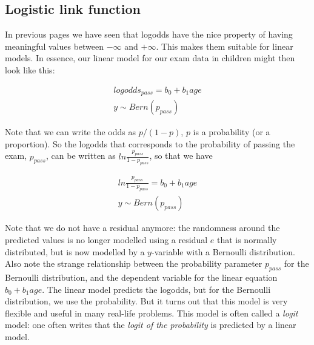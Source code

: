 \documentclass[]{book}\usepackage[]{graphicx}\usepackage[]{color}
\begin{document}
% 
% 
% 
% 
% 
% 
% 
% 
% 


\subsection{Logistic link function}

In previous pages we have seen that logodds have the nice property of having meaningful values between $-\infty$ and $+\infty$. This makes them suitable for linear models. In essence, our linear model for our exam data in children might then look like this:


\begin{eqnarray}
logodds_{pass}= b_0 + b_1 age\\
y \sim Bern(p_{pass})
\end{eqnarray}

Note that we can write the odds as $p/(1-p)$, $p$ is a probability (or a proportion). So the logodds that corresponds to the probability of passing the exam, $p_{pass}$, can be written as $ln\frac{p_{pass}}{1- p_{pass}}$, so that we have


\begin{eqnarray}
ln\frac{p_{pass}}{1- p_{pass}}= b_0 + b_1 age \\
y \sim Bern(p_{pass})
\end{eqnarray}

Note that we do not have a residual anymore: the randomness around the predicted values is no longer modelled using a residual $e$ that is normally distributed, but is now modelled by a $y$-variable with a Bernoulli distribution.
Also note the strange relationship between the probability parameter $p_{pass}$ for the Bernoulli distribution, and the dependent variable for the linear equation $b_0+b_1 age$. The linear model predicts the logodds, but for the Bernoulli distribution, we use the probability. But it turns out that this model is very flexible and useful in many real-life problems. This model is often called a \textit{logit} model: one often writes that the \textit{logit of the probability} is predicted by a linear model.
\end{document}
